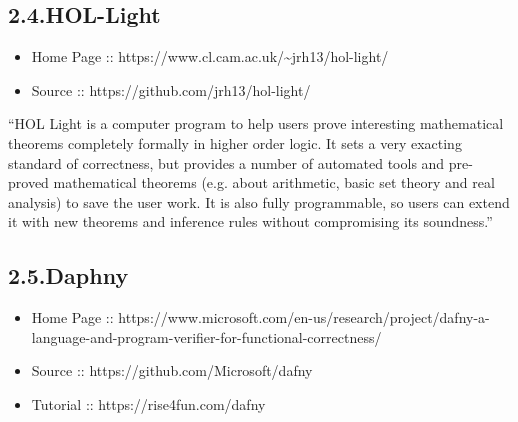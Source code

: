 \documentclass[12pt,twoside]{article}
\begin{document}
\subsection{2.4.\hspace*{0.5em}HOL-Light}\label{sec-hol-light}%

\begin{itemize}[noitemsep,topsep=\mdcompacttopsep]%

\item{}Home Page :: https://www.cl.cam.ac.uk/\textasciitilde{}jrh13/hol-light/%

\item{}Source :: https://github.com/jrh13/hol-light/%
\end{itemize}%

\noindent{}\textquotedblleft{}HOL Light is a computer program to help users prove interesting
mathematical theorems completely formally in higher order logic. It
sets a very exacting standard of correctness, but provides a number of
automated tools and pre-proved mathematical theorems (e.g. about
arithmetic, basic set theory and real analysis) to save the user
work. It is also fully programmable, so users can extend it with new
theorems and inference rules without compromising its soundness.\textquotedblright{}%

\subsection{2.5.\hspace*{0.5em}Daphny}\label{sec-daphny}%

\begin{itemize}[noitemsep,topsep=\mdcompacttopsep]%

\item{}Home Page :: https://www.microsoft.com/en-us/research/project/dafny-a-language-and-program-verifier-for-functional-correctness/%

\item{}Source :: https://github.com/Microsoft/dafny%

\item{}Tutorial :: https://rise4fun.com/dafny%
\end{itemize}%
\end{document}
